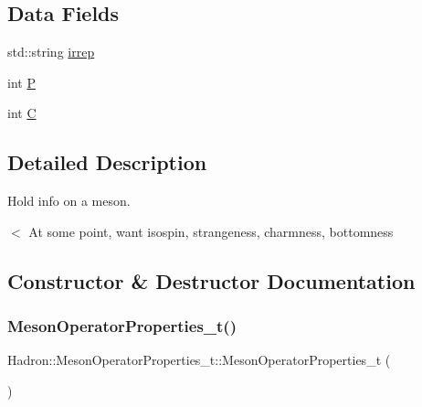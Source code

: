 \subsection*{Data Fields}
\begin{DoxyCompactItemize}
\item 
std\+::string \mbox{\hyperlink{structHadron_1_1MesonOperatorProperties__t_a70e362a662368b771e11a3dd4bfdac7d}{irrep}}
\item 
int \mbox{\hyperlink{structHadron_1_1MesonOperatorProperties__t_a98618ec3eaa711794139ab44404db273}{P}}
\item 
int \mbox{\hyperlink{structHadron_1_1MesonOperatorProperties__t_a0aa883e94ef86b6f7f294e6e330d1ddc}{C}}
\end{DoxyCompactItemize}


\subsection{Detailed Description}
Hold info on a meson. 

$<$ At some point, want isospin, strangeness, charmness, bottomness 

\subsection{Constructor \& Destructor Documentation}
\mbox{\label{structHadron_1_1MesonOperatorProperties__t_aa487d0682fa07b3cf7f81dae4575cdd4}} 
\subsubsection{\texorpdfstring{MesonOperatorProperties\_t()}{MesonOperatorProperties\_t()}\hspace{0.1cm}{\footnotesize\ttfamily [1/4]}}
{\footnotesize\ttfamily Hadron\+::\+Meson\+Operator\+Properties\+\_\+t\+::\+Meson\+Operator\+Properties\+\_\+t (\begin{DoxyParamCaption}{ }\end{DoxyParamCaption})\hspace{0.3cm}{\ttfamily [inline]}}

\mbox{\label{structHadron_1_1MesonOperatorProperties__t_a28d5b4aa6225854a98bc838c9c9872ea}} 
